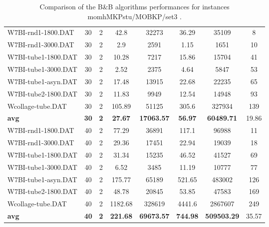 \begin{table}[!ht]
{\begin{tabular}{lccccccc}
W7BI-rnd1-1800.DAT & 30 & 2 & 42.8 & 32273 &  \textcolor{blue2}{36.29} & 35109 & 8 \\
W7BI-rnd1-3000.DAT & 30 & 2 & 2.9 & 2591 &  \textcolor{blue2}{1.15} & 1651 & 10 \\
W7BI-tube1-1800.DAT & 30 & 2 &  \textcolor{blue2}{10.28} & 7217 & 15.86 & 15704 & 41 \\
W7BI-tube1-3000.DAT & 30 & 2 &  \textcolor{blue2}{2.52} & 2375 & 4.64 & 5847 & 53 \\
W7BI-tube1-asyn.DAT & 30 & 2 &  \textcolor{blue2}{17.48} & 13915 & 22.68 & 22235 & 65 \\
W7BI-tube2-1800.DAT & 30 & 2 &  \textcolor{blue2}{11.83} & 9949 & 12.54 & 14948 & 93 \\
Wcollage-tube.DAT & 30 & 2 &  \textcolor{blue2}{105.89} & 51125 & 305.6 & 327934 & 139 \\
\cline{1-8} \textbf{avg} & \textbf{30} & \textbf{2} & \textbf{27.67} & \textbf{17063.57} & \textbf{56.97} & \textbf{60489.71} & 19.86\\ \cline{1-8}
W7BI-rnd1-1800.DAT & 40 & 2 &  \textcolor{blue2}{77.29} & 36891 & 117.1 & 96988 & 11 \\
W7BI-rnd1-3000.DAT & 40 & 2 & 29.36 & 17451 &  \textcolor{blue2}{22.94} & 19039 & 18 \\
W7BI-tube1-1800.DAT & 40 & 2 &  \textcolor{blue2}{31.34} & 15235 & 46.52 & 41527 & 69 \\
W7BI-tube1-3000.DAT & 40 & 2 &  \textcolor{blue2}{6.52} & 3485 & 11.19 & 10777 & 77 \\
W7BI-tube1-asyn.DAT & 40 & 2 &  \textcolor{blue2}{175.77} & 65189 & 521.65 & 483002 & 126 \\
W7BI-tube2-1800.DAT & 40 & 2 &  \textcolor{blue2}{48.78} & 20845 & 53.85 & 47583 & 169 \\
Wcollage-tube.DAT & 40 & 2 &  \textcolor{blue2}{1182.68} & 328619 & 4441.6 & 2867607 & 249 \\
\cline{1-8} \textbf{avg} & \textbf{40} & \textbf{2} & \textbf{221.68} & \textbf{69673.57} & \textbf{744.98} & \textbf{509503.29} & 35.57\\ \cline{1-8}
\bottomrule
\end{tabular}
}%
\caption{Comparison of the B\&B algorithms performances for instances momhMKPstu/MOBKP/set3 .}
\label{tab:table_compareBB_momhMKPstu/MOBKP/set3 }
\end{table}
